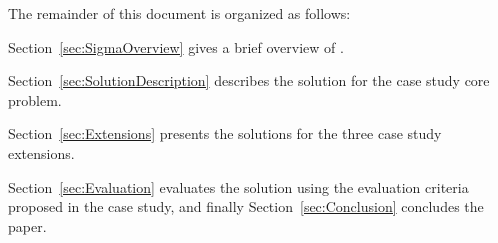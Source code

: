 The remainder of this document is organized as follows:
\begin{inparaitem}[]
	\item Section~\ref{sec:SigmaOverview} gives a brief overview of \SIGMA.
	\item Section~\ref{sec:SolutionDescription} describes the solution for the case study core problem.
	\item Section~\ref{sec:Extensions} presents the solutions for the three case study extensions.
	\item Section~\ref{sec:Evaluation} evaluates the solution using the evaluation criteria proposed in the case study, and finally Section~\ref{sec:Conclusion} concludes the paper.
\end{inparaitem}
%
